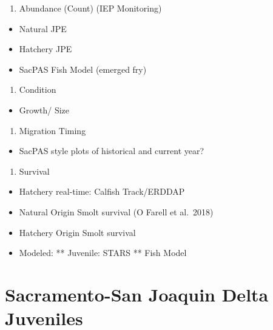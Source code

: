 \documentclass[
]{book}
\providecommand{\tightlist}{%
  \setlength{\itemsep}{0pt}\setlength{\parskip}{0pt}}
\theoremstyle{definition}
\theoremstyle{definition}
\theoremstyle{definition}
\theoremstyle{definition}
\theoremstyle{remark}
\begin{document}
\begin{enumerate}
\def\labelenumi{\arabic{enumi}.}
\tightlist
\item
  Abundance (Count) (IEP Monitoring)
\end{enumerate}

\begin{itemize}
\tightlist
\item
  Natural JPE
\item
  Hatchery JPE
\item
  SacPAS Fish Model (emerged fry)
\end{itemize}

\begin{enumerate}
\def\labelenumi{\arabic{enumi}.}
\setcounter{enumi}{1}
\tightlist
\item
  Condition
\end{enumerate}

\begin{itemize}
\tightlist
\item
  Growth/ Size
\end{itemize}

\begin{enumerate}
\def\labelenumi{\arabic{enumi}.}
\setcounter{enumi}{2}
\tightlist
\item
  Migration Timing
\end{enumerate}

\begin{itemize}
\tightlist
\item
  SacPAS style plots of historical and current year?
\end{itemize}

\begin{enumerate}
\def\labelenumi{\arabic{enumi}.}
\setcounter{enumi}{3}
\tightlist
\item
  Survival
\end{enumerate}

\begin{itemize}
\tightlist
\item
  Hatchery real-time: Calfish Track/ERDDAP
\item
  Natural Origin Smolt survival (O Farell et al.~2018)
\item
  Hatchery Origin Smolt survival
\item
  Modeled:
  ** Juvenile: STARS
  ** Fish Model
\end{itemize}

\hypertarget{sacramento-san-joaquin-delta-juveniles}{%
\chapter{Sacramento-San Joaquin Delta Juveniles}\label{sacramento-san-joaquin-delta-juveniles}}
\end{document}
